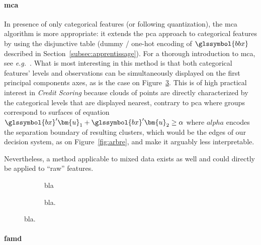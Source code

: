 \paragraph{\gls{mca}}

In presence of only categorical features (or following quantization), the \gls{mca} algorithm is more appropriate: it extends the \gls{pca} approach to categorical features by using the disjunctive table (dummy / one-hot encoding of $\glssymbol{bbx}$ described in Section~\ref{subsec:apprentissage}). For a thorough introduction to \gls{mca}, see \textit{e.g.}~\cite{lebart1995statistique}. What is most interesting in this method is that both categorical features' levels and observations can be simultaneously displayed on the first principal components axes, as is the case on Figure~\ref{fig:mca}.
This is of high practical interest in \textit{Credit Scoring} because clouds of points are directly characterized by the categorical levels that are displayed nearest, contrary to \gls{pca} where groups correspond to surfaces of equation $\glssymbol{bx} ' \bm{u}_1 + \glssymbol{bx} ' \bm{u}_2 \geq \alpha$ where $alpha$ encodes the separation boundary of resulting clusters, which would be the edges of our decision system, as on Figure~\ref{fig:arbre}, and make it arguably less interpretable.

Nevertheless, a method applicable to mixed data exists as well and could directly be applied to ``raw'' features.

\begin{figure}[!htb]
{\setlength{\parindent}{0cm}}

\begin{multicols}{2}
\centering
\begin{subfigure}[t]{0.45\textwidth}
\centering
\resizebox{\textwidth}{!}{}
\caption{\label{fig:mca1} bla}
\end{subfigure}%
\columnbreak
\hspace*{1cm} \begin{subfigure}[t]{0.45\textwidth}
\centering
\resizebox{\textwidth}{!}{}
\caption{\label{fig:mca2} bla.}
\end{subfigure}
\end{multicols}

\caption{\label{fig:mca} bla.}
\end{figure}

\paragraph{\gls{famd}}

